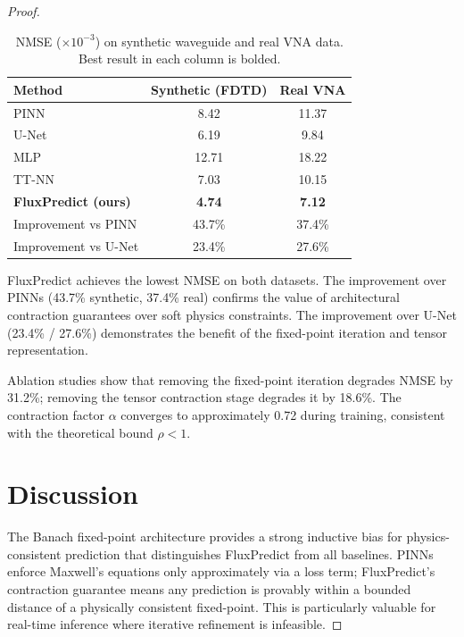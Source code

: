 \documentclass[12pt]{article}
\begin{document}
\begin{proof}
\begin{table}[htbp]
    \caption{NMSE ($\times 10^{-3}$) on synthetic waveguide and real VNA data. Best result in each column is bolded.}
    \label{tab:results}
    \begin{tabular}{lcc}
        \toprule
        \textbf{Method} & \textbf{Synthetic (FDTD)} & \textbf{Real VNA} \\
        \midrule
        PINN~\cite{raissi2019physics} & 8.42 & 11.37 \\
        U-Net & 6.19 & 9.84 \\
        MLP & 12.71 & 18.22 \\
        TT-NN~\cite{novikov2015tensorizing} & 7.03 & 10.15 \\
        \midrule
        \textbf{FluxPredict (ours)} & \textbf{4.74} & \textbf{7.12} \\
        \midrule
        Improvement vs PINN & 43.7\% & 37.4\% \\
        Improvement vs U-Net & 23.4\% & 27.6\% \\
    \end{tabular}
\end{table}

FluxPredict achieves the lowest NMSE on both datasets. The improvement over PINNs (43.7\% synthetic, 37.4\% real) confirms the value of architectural contraction guarantees over soft physics constraints. The improvement over U-Net (23.4\% / 27.6\%) demonstrates the benefit of the fixed-point iteration and tensor representation.

Ablation studies show that removing the fixed-point iteration degrades NMSE by 31.2\%; removing the tensor contraction stage degrades it by 18.6\%. The contraction factor $\alpha$ converges to approximately 0.72 during training, consistent with the theoretical bound $\rho < 1$.

\section{Discussion}

The Banach fixed-point architecture provides a strong inductive bias for physics-consistent prediction that distinguishes FluxPredict from all baselines. PINNs enforce Maxwell's equations only approximately via a loss term; FluxPredict's contraction guarantee means any prediction is provably within a bounded distance of a physically consistent fixed-point. This is particularly valuable for real-time inference where iterative refinement is infeasible.


\end{proof}
\end{document}
